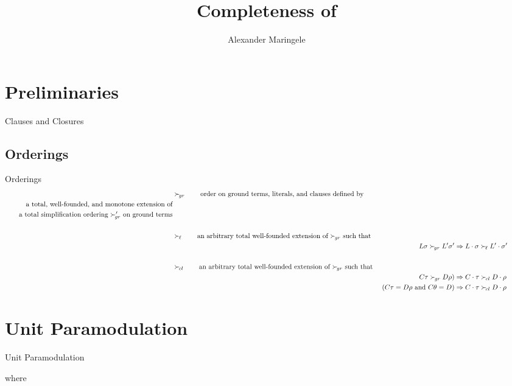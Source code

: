 \documentclass[%
]{beamer}
\title[Completeness]{Completeness of }
\author[{A$\ell$M}]{%
	Alexander Maringele
}
\institute[UIBK]{%
	{alexander.maringele@gmail.com}
}
\begin{document}
\titleframe

\begin{frame}
    \nocite{GK2004csl}
    
    
\end{frame}


\section{Preliminaries}


\begin{frame}{Clauses and Closures}

\end{frame}

\subsection{Orderings}
\begin{frame}{Orderings}
    \begin{align*}
        &\succG
        \tag*{order on ground terms, literals, and clauses defined by}
        \\
        \tag*{a total, well-founded, and monotone extension of}
        \\
        \tag*{a total simplification ordering $\succG'$ on ground terms}
        \\
        \\
        &\succL
        \tag*{an arbitrary total well-founded extension of $\succG$ such that}
        \\
        && L\sigma\succG L'\sigma' &\Rightarrow L\cdot\sigma\succL L'\cdot\sigma'\tag*{}
        \\
        \\
        &\succC \tag*{an arbitrary total well-founded extension of $\succG$ such that }
        \\
        && C\tau\succG D\rho\text)
        &\Rightarrow C\cdot\tau\succC D\cdot\rho   \tag*{}
        \\
        && (C\tau=D\rho\text{ and }C\theta = D)
        &\Rightarrow C\cdot\tau\succC D\cdot\rho   \tag*{}
    \end{align*}
\end{frame}

\section{Unit Paramodulation}
\begin{frame}{Unit Paramodulation}

    \begin{definition}
    
    where
    
    \end{definition}
\end{frame}
\end{document}

